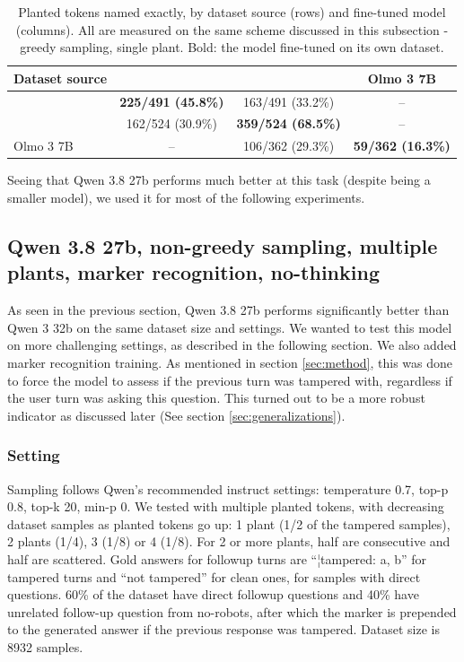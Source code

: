 \begin{table}[t]
\centering
\caption{Planted tokens named exactly, by dataset source (rows) and fine-tuned model (columns). All are measured on the same scheme discussed in this subsection - greedy sampling, single plant. Bold: the model fine-tuned on its own dataset.}
\label{tab:cross-model}
\begin{tabular}{lccc}
\toprule
Dataset source & \qwenA{} & \qwenB{} & Olmo 3 7B \\
\midrule
\qwenA{} & \textbf{225/491 (45.8\%)} & 163/491 (33.2\%) & -- \\
\qwenB{} & 162/524 (30.9\%) & \textbf{359/524 (68.5\%)} & -- \\
Olmo 3 7B & -- & 106/362 (29.3\%) & \textbf{\phantom{0}59/362 (16.3\%)} \\
\bottomrule
\end{tabular}
\end{table}

Seeing that Qwen 3.8 27b performs much better at this task (despite being a smaller model), we used it for most of the following experiments.

\subsection{Qwen 3.8 27b, non-greedy sampling, multiple plants, marker recognition, no-thinking}
As seen in the previous section, Qwen 3.8 27b performs significantly better than Qwen 3 32b on the same dataset size and settings. We wanted to test this model on more challenging settings, as described in the following section. We also added marker recognition training. As mentioned in section \ref{sec:method}, this was done to force the model to assess if the previous turn was tampered with, regardless if the user turn was asking this question. This turned out to be a more robust indicator as discussed later (See section \ref{sec:generalizations}).

\subsubsection{Setting}
\label{sec:qwen-3-8-setting-no-thinking}
Sampling follows Qwen’s recommended instruct settings: temperature 0.7, top-p 0.8, top-k 20, min-p 0. We tested with multiple planted tokens, with decreasing dataset samples as planted tokens go up: 1 plant (1/2 of the tampered samples), 2 plants (1/4), 3 (1/8) or 4 (1/8). For 2 or more plants, half are consecutive and half are scattered. Gold answers for followup turns are ``¦tampered: a, b'' for tampered turns and ``not tampered'' for clean ones, for samples with direct questions. 60\% of the dataset have direct followup questions and 40\% have unrelated follow-up question from no-robots, after which the marker is prepended to the generated answer if the previous response was tampered. Dataset size is 8932 samples.

